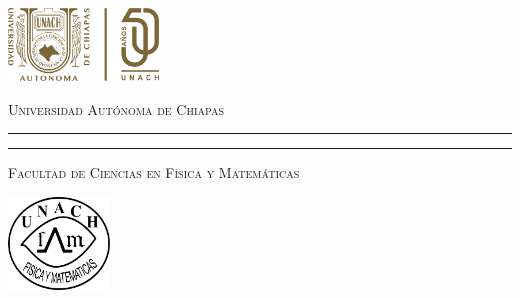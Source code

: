 \begin{titlepage}
\hspace{-1.7cm} %
\begin{minipage}[t][0.03\textheight][c]{0.22\textwidth}
        \includegraphics[width=4.0cm]{LOGO50.png}
\end{minipage}\hspace{0.9cm}
\begin{minipage}[t][0.03\textheight][c]{0.69\textwidth}
\begin{center}
                \textsc{\huge Universidad Autónoma de Chiapas}\\[0.3cm]
                \hrule height 2.5pt
                \vspace{0.2cm}
                \hrule height1pt
                \vspace{0.3cm}
                \textsc{\Large Facultad de Ciencias en Física y Matemáticas}
\end{center}
\end{minipage}\hspace{0.2cm}
\begin{minipage}[t][0.03\textheight][c]{0.2\textwidth}
		\includegraphics[width=2.7cm]{logofcfm.png}
\end{minipage}\\
\begin{minipage}[t][0.93\textheight][c]{0.06\textwidth}
\vspace{60pt}
    \begin{center}
        \vrule width1pt height18cm
        \vspace{5mm}
        \vrule width2.5pt height18cm
        \vspace{5mm}
        \vrule width1pt height18cm
   \end{center}
\end{minipage}\hspace{1.3cm} %
\begin{minipage}[t][0.95\textheight][c]{0.76\textwidth}


\end{minipage}
\end{titlepage}
